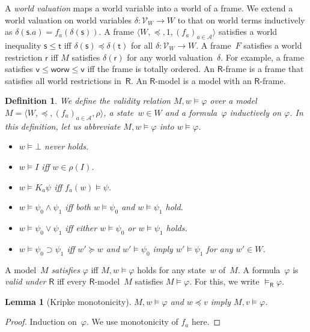 \documentclass[doctor]{iscs-thesis}
\newcommand{\agents}{\mathcal A}
\newcommand{\tuple}[1]{\langle{#1}\rangle}
\newcommand{\modelsR}{\models_{\mathsf R}}
\newtheorem{definition}{Definition}
\newtheorem{lemma}{Lemma}
\newcommand{\wor}{\mathsf{{or}}}
\begin{document}
A \textit{world valuation} maps a world variable into a world of a frame.
We extend a world valuation on world variables
$\delta\colon\mathcal V_W\rightarrow W$ to that on world terms
inductively as $\delta(\mathsf s.a)=f_a(\delta(\mathsf s))$.
A frame $\tuple{W,\preceq, 1,(f_a)_{a\in\agents}}$ satisfies a world inequality
$\mathsf s\le\mathsf t$ iff $\delta(\mathsf s)\preceq \delta(\mathsf t)$
for all $\delta\colon\mathcal V_W\rightarrow W$.
A frame~$F$ satisfies a world restriction $\mathsf r$
iff $M$ satisfies $\delta(\mathsf r)$ for any world valuation~$\delta$.
For example, a frame satisfies $\mathsf v\le \mathsf w\wor\mathsf
w\le\mathsf v$ iff the frame is totally ordered.
An $\mathsf R$-frame is a frame that
satisfies all world restrictions in~$\mathsf R$.
An $\mathsf R$-model is a model with an $\mathsf R$-frame.


\begin{definition}
 We define the \textit{validity relation} $M,w\models\varphi$ over a model
 $M = \tuple{W,\preceq,(f_a)_{a\in \agents},\rho}$, a state~$w\in W$ and a
 formula~$\varphi$ inductively on $\varphi$.
 In this definition, let
 us abbreviate $M,w\models \varphi$ into $w\models \varphi$\enspace.
\newcommand{\m}{}
\begin{itemize}
\item $w\models \bot$ never holds.
\item $w\models I$ iff
$w \in
 \rho(I)$.
\item	    $w\models K_a \psi$ iff
	    $f_a(w)\models \psi$.
\item $w\models \psi_0\wedge\psi_1$ iff both
 $w\models \psi_0$ and $w\models \psi_1$ hold.
\item
 $ w\models \psi_0\vee\psi_1$ iff either
 $ w\models \psi_0$ or $w\models \psi_1$ holds.
\item
	   $w\models \psi_0\supset\psi_1$ iff 
	   $w'\succeq w$ and $w'\models \psi_0$ imply
	   $w'\models\psi_1$ for any $w'\in W$\enspace.
\end{itemize}
\end{definition}
A model~$M$ \textit{satisfies} $\varphi$ iff $M,w\models\varphi$ holds for any
state~$w$ of~$M$.
A formula~$\varphi$ is \textit{valid under} $\mathsf R$ iff
every $\mathsf R$-model~$M$ satisfies $M\models \varphi$.
For this, we write $\modelsR \varphi$\enspace.

\begin{lemma}[Kripke monotonicity]
 \label{monot}
 $M,w\models\varphi$ and $w\preceq v$ imply 
$M,v\models\varphi$.
\end{lemma}
\begin{proof}
 Induction on~$\varphi$.
 We use monotonicity of $f_a$ here.
\end{proof}
\end{document}
